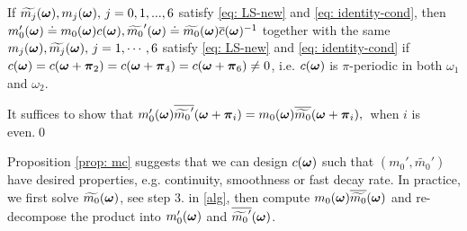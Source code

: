 \begin{proposition}\label{prop: mc}
If $\widetilde{m_{j}}(\boldsymbol{\omega}), m_j(\boldsymbol{\omega}),\,  j = 0,1,...,6$ satisfy \eqref{eq: LS-new} and \eqref{eq: identity-cond}, 
then $m_0'(\boldsymbol{\omega})\doteq m_0(\boldsymbol{\omega})c(\boldsymbol{\omega}), \widetilde{m_0}'(\boldsymbol{\omega})\doteq \widetilde{m_{0}}(\boldsymbol{\omega})\overline{c}(\boldsymbol{\omega})^{-1}$ together with the same $m_j(\boldsymbol{\omega}),\widetilde{m_{j}}(\boldsymbol{\omega}), \, j = 1,\cdots,6$ 
satisfy \eqref{eq: LS-new} and \eqref{eq: identity-cond} if $ c(\boldsymbol{\omega}) = c(\boldsymbol{\omega}+\boldsymbol{\pi}_2)=c(\boldsymbol{\omega}+\boldsymbol{\pi}_4) = c(\boldsymbol{\omega}+\boldsymbol{\pi}_6) \neq 0$, i.e. $c(\boldsymbol{\omega})$ is $\pi$-periodic in both $\omega_1$ and $\omega_2$.
\end{proposition}
It suffices to show that $m_0'(\boldsymbol{\omega})\overline{\widetilde{m_0}'}(\boldsymbol{\omega} + \boldsymbol{\pi}_i) = m_0(\boldsymbol{\omega})\overline{\widetilde{m_{0}}}(\boldsymbol{\omega} + \boldsymbol{\pi}_{i}),\,$ when $i$ is even.\qed


Proposition \ref{prop: mc} suggests that we can design $c(\boldsymbol{\omega})$ such that $(m_0',\widetilde{m_0}')$ have desired properties, e.g. continuity, smoothness or fast decay rate. In practice, we first solve $\widetilde{m_{0}}(\boldsymbol{\omega})$, see step 3. in \ref{alg}, then compute $m_0(\boldsymbol{\omega})\overline{\widetilde{m_{0}}}(\boldsymbol{\omega})$ and re-decompose the product into $m_0'(\boldsymbol{\omega})$ and $\overline{\widetilde{m_0}'}(\boldsymbol{\omega})$.

